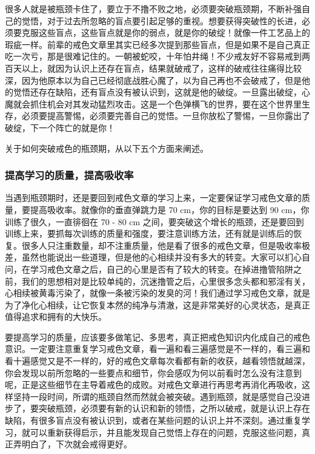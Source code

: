 很多人就是被瓶颈卡住了，要立于不撸不败之地，必须要突破瓶颈期，不断补强自己的觉悟，对于过去所忽略的盲点要引起足够的重视。想要获得突破性的长进，必须要克服这些盲点，这些盲点就是你的弱点，就是你的破绽！就像一件工艺品上的瑕疵一样。前辈的戒色文章里其实已经多次提到那些盲点，但是如果不是自己真正吃一次亏，那是很难记住的。一朝被蛇咬，十年怕井绳！不少戒友好不容易戒到两百天以上，就因为认识上还存在盲点，结果就破戒了，这样的破戒往往痛得比较深，因为他原本以为自己已经彻底战胜心魔了，以为自己再也不会破戒了，但是他的觉悟还存在缺陷，还有盲点没有被认识到，这就是他的破绽。一旦露出破绽，心魔就会抓住机会对其发动猛烈攻击。这是一个色弹横飞的世界，要在这个世界里生存，必须要提高警惕，必须要完善自己的觉悟。一旦你放松了警惕，一旦你露出了破绽，下一个阵亡的就是你！

关于如何突破戒色的瓶颈期，从以下五个方面来阐述。

\subsubsection{提高学习的质量，提高吸收率}

当遇到瓶颈期时，还是要回到戒色文章的学习上来，一定要保证学习戒色文章的质量，要提高吸收率。就像你的垂直弹跳力是 70 \unit{\cm}，你的目标是要达到 90 \unit{\cm}，你训练了很久，一直徘徊在 70 - 80 \unit{\cm} 之间，要突破这个增长的瓶颈，还是要回到训练上来，要抓每次训练的质量和强度，要注意训练方法，还有就是训练后的恢复。很多人只注重数量，却不注重质量，他是看了很多的戒色文章，但是吸收率极差，虽然也能说出一些道理，但是他的心相续并没有多大的转变。大家可以扪心自问，在学习戒色文章之后，自己的心里是否有了较大的转变。在掉进撸管陷阱之前，我们的思想相对是比较单纯的，沉迷撸管之后，心里很多念头都和邪淫有关，心相续被黄毒污染了，就像一条被污染的发臭的河！我们通过学习戒色文章，就是为了净化心相续，让它恢复本然的纯净与清澈，这是非常美好的心灵状态，是真正值得追求和拥有的大快乐。

要提高学习的质量，应该要多做笔记、多思考，真正把戒色知识内化成自己的戒色意识。一定要注意重复学习戒色文章，看一遍和看三遍感觉是不一样的，看三遍和看十遍感觉又是不一样的，好的戒色文章每次看都有新的收获，越看领悟就越深，你会发现以前所忽略的一些要点和细节，你会感叹为何以前看时怎么没有注意到呢，正是这些细节在主导着戒色的成败。对戒色文章进行再思考再消化再吸收，这样坚持一段时间，所谓的瓶颈自然而然就会被突破。遇到瓶颈，就是感觉自己没进步了，要突破瓶颈，必须要有新的认识和新的领悟，之所以破戒，就是认识上存在缺陷，有很多盲点没有被认识到，或者在某些问题的认识上并不深刻。通过重复学习，就可以重新获得启示，并且能发现自己觉悟上存在的问题，克服这些问题，真正弄明白了，下次就会戒得更好。

